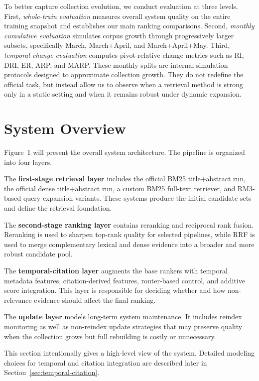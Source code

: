 \documentclass[11pt]{article}
\begin{document}
To better capture collection evolution, we conduct evaluation at three levels. First, \emph{whole-train evaluation} measures overall system quality on the entire training snapshot and establishes our main ranking comparisons. Second, \emph{monthly cumulative evaluation} simulates corpus growth through progressively larger subsets, specifically March, March+April, and March+April+May. Third, \emph{temporal-change evaluation} computes pivot-relative change metrics such as RI, DRI, ER, ARP, and MARP. These monthly splits are internal simulation protocols designed to approximate collection growth. They do not redefine the official task, but instead allow us to observe when a retrieval method is strong only in a static setting and when it remains robust under dynamic expansion.

\section{System Overview}

Figure~1 will present the overall system architecture. The pipeline is organized into four layers.

The \textbf{first-stage retrieval layer} includes the official BM25 title+abstract run, the official dense title+abstract run, a custom BM25 full-text retriever, and RM3-based query expansion variants. These systems produce the initial candidate sets and define the retrieval foundation.

The \textbf{second-stage ranking layer} contains reranking and reciprocal rank fusion. Reranking is used to sharpen top-rank quality for selected pipelines, while RRF is used to merge complementary lexical and dense evidence into a broader and more robust candidate pool.

The \textbf{temporal-citation layer} augments the base rankers with temporal metadata features, citation-derived features, router-based control, and additive score integration. This layer is responsible for deciding whether and how non-relevance evidence should affect the final ranking.

The \textbf{update layer} models long-term system maintenance. It includes reindex monitoring as well as non-reindex update strategies that may preserve quality when the collection grows but full rebuilding is costly or unnecessary.

This section intentionally gives a high-level view of the system. Detailed modeling choices for temporal and citation integration are described later in Section~\ref{sec:temporal-citation}.
\end{document}

